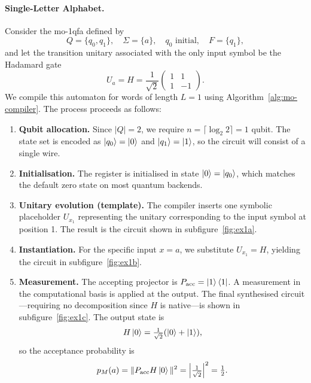 \paragraph{Single-Letter Alphabet.}
\label{ex:moqfa-single-letter}
Consider the \gls{mo-1qfa} defined by
\[
Q = \{q_0, q_1\}, \quad \Sigma = \{a\}, \quad q_0 \text{ initial}, \quad F = \{q_1\},
\]
and let the transition unitary associated with the only input symbol be the Hadamard gate
\[
U_a = H = \frac{1}{\sqrt{2}}
\begin{pmatrix}
1 & 1 \\
1 & -1
\end{pmatrix}.
\]
We compile this automaton for words of length $L = 1$ using Algorithm~\ref{alg:mo-compiler}. The process proceeds as follows:

\begin{enumerate}
\item \textbf{Qubit allocation.} Since $|Q| = 2$, we require $n = \lceil \log_2 2 \rceil = 1$ qubit. The state set is encoded as $\ket{q_0} = \ket{0}$ and $\ket{q_1} = \ket{1}$, so the circuit will consist of a single wire.

\item \textbf{Initialisation.} The register is initialised in state $\ket{0} = \ket{q_0}$, which matches the default zero state on most quantum backends.

\item \textbf{Unitary evolution (template).} The compiler inserts one symbolic placeholder $\boxed{U_{x_1}}$ representing the unitary corresponding to the input symbol at position 1. The result is the circuit shown in subfigure~\ref{fig:ex1a}.

\item \textbf{Instantiation.} For the specific input $x = a$, we substitute $U_{x_1} = H$, yielding the circuit in subfigure~\ref{fig:ex1b}.

\item \textbf{Measurement.} The accepting projector is $P_{\text{acc}} = \ket{1}\bra{1}$. A measurement in the computational basis is applied at the output. The final synthesised circuit—requiring no decomposition since $H$ is native—is shown in subfigure~\ref{fig:ex1c}. The output state is
\[
H\ket{0} = \tfrac{1}{\sqrt{2}}(\ket{0} + \ket{1}),
\]
so the acceptance probability is
\[
p_M(a) = \|P_{\text{acc}} H \ket{0}\|^2 = \left|\tfrac{1}{\sqrt{2}}\right|^2 = \tfrac{1}{2}.
\]
\end{enumerate}

